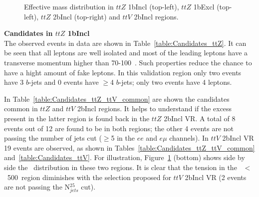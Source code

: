 \begin{figure}[h!]
\centering
{}
\caption{Effective mass distribution in $ttZ$ 1bIncl (top-left), $ttZ$ 1bExcl (top-left), $ttZ$ 2bIncl (top-right) and $ttV$ 2bIncl regions.}
\label{fig:Results_VRttZ_ttV}
\end{figure}
  
 
\par{\bf Candidates in $ttZ$ 1bIncl \\}
The observed events in data are shown in Table~\ref{table:Candidates_ttZ}. It can be seen that all leptons are well isolated and most of the leading leptons have a transverse momentum higher than 70-100~\GeV. Such properties reduce the chance to have a hight amount of fake leptons. In this validation region only two events have 3 $b$-jets and 0 events have $\geq$4 $b$-jets; only two events have 4 leptons. 

In Table~\ref{table:Candidates_ttZ_ttV_common} are shown the candidates common in $ttZ$ and $ttV$ 2bIncl regions. It helps to understand if the excess present in the latter region is found back in the $ttZ$ 2bIncl VR. A total of 8 events out of 12 are found to be in both regions; the other 4 events are not passing the number of jets cut ($\geq$5 in the $ee$ and $e\mu$ channels). In $ttV$ 2bIncl VR 19 events are observed, as shown in Tables~\ref{table:Candidates_ttZ_ttV_common} and~\ref{table:Candidates_ttV}. For illustration, Figure~\ref{fig:Results_VRttZ_ttV} (bottom) shows side by side the \meff\ distribution in these two regions. It is clear that the tension in the \meff~$<$~500~\GeV region diminishes with the selection proposed for $ttV$ 2bIncl VR (2 events are not passing the N$_{jets}^{25}$ cut). 

